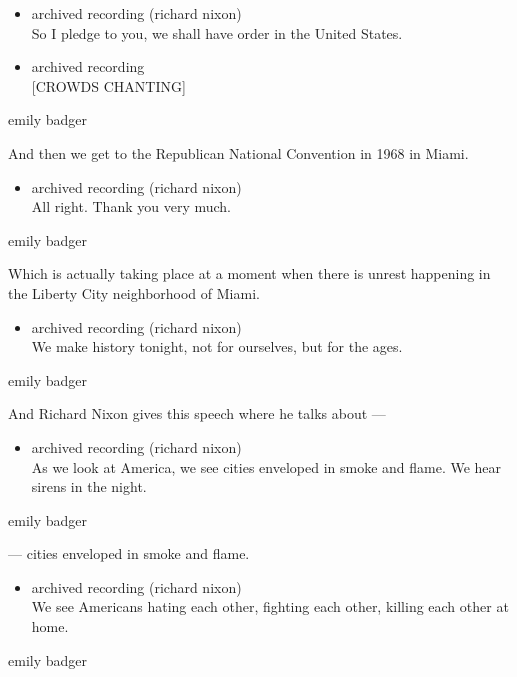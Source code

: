 \begin{itemize}
\item
  archived recording (richard nixon)\\
  So I pledge to you, we shall have order in the United States.
\item
  archived recording\\
  {[}CROWDS CHANTING{]}
\end{itemize}

emily badger

And then we get to the Republican National Convention in 1968 in Miami.

\begin{itemize}
\tightlist
\item
  archived recording (richard nixon)\\
  All right. Thank you very much.
\end{itemize}

emily badger

Which is actually taking place at a moment when there is unrest
happening in the Liberty City neighborhood of Miami.

\begin{itemize}
\tightlist
\item
  archived recording (richard nixon)\\
  We make history tonight, not for ourselves, but for the ages.
\end{itemize}

emily badger

And Richard Nixon gives this speech where he talks about ---

\begin{itemize}
\tightlist
\item
  archived recording (richard nixon)\\
  As we look at America, we see cities enveloped in smoke and flame. We
  hear sirens in the night.
\end{itemize}

emily badger

--- cities enveloped in smoke and flame.

\begin{itemize}
\tightlist
\item
  archived recording (richard nixon)\\
  We see Americans hating each other, fighting each other, killing each
  other at home.
\end{itemize}

emily badger

